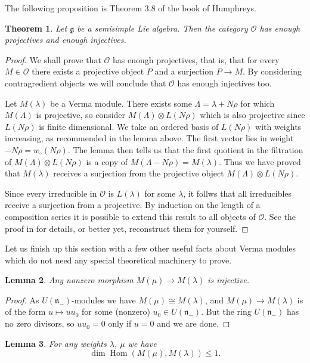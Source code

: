 \documentclass[12pt]{article}
\theoremstyle{plain}
\newtheorem{thm}{Theorem}[section]
\newtheorem{lemma}[thm]{Lemma}
\theoremstyle{definition}
\numberwithin{equation}{section}
\DeclareMathOperator{\Hom}{Hom}
\newcommand{\la}{\lambda}
\newcommand{\La}{\Lambda}
\newcommand{\g}{\mathfrak{g}}
\newcommand{\n}{\mathfrak{n}}
\newcommand{\OO}{\mathcal{O}}
\begin{document}
The following proposition is Theorem 3.8 of the book \cite{humbgg} of Humphreys.
\begin{thm}
Let $\g$ be a semisimple Lie algebra. Then the category $\OO$ has enough projectives and enough injectives.
\end{thm}


\begin{proof}
We shall prove that $\OO$ has enough projectives, that is, that for every $M \in \OO$ there exists a projective object $P$ and a surjection $P \rightarrow M$. By considering contragredient objects we will conclude that $\OO$ has enough injectives too.

Let $M(\la)$ be a Verma module. There exists some $\La = \la + N \rho$ for which $M(\La)$ is projective, so consider $M(\La) \otimes L(N\rho)$ which is also projective since $L(N\rho)$ is finite dimensional. We take an ordered basis of $L(N\rho)$ with weights increasing, as recommended in the lemma above. The first vector lies in weight $-N\rho = w_\circ(N\rho)$. The lemma then tells us that the first quotient in the filtration of $M(\La) \otimes L(N\rho)$ is a copy of $M(\La-N\rho) = M(\la)$. Thus we have proved that $M(\la)$ receives a surjection from the projective object $M(\La) \otimes L(N\rho)$.

Since every irreducible in $\OO$ is $L(\la)$ for some $\la$, it follws that all irreducibles receive a surjection from a projective. By induction on the length of a composition series it is possible to extend this result to all objects of $\OO$. See the proof in \cite{humbgg} for details, or better yet, reconstruct them for yourself.
\end{proof}


Let us finish up this section with a few other useful facts about Verma modules which do not need any special theoretical machinery to prove.
\begin{lemma}
Any nonzero morphism $M(\mu) \rightarrow M(\la)$ is injective.
\end{lemma}

\begin{proof}
As $U(\n_-)$-modules we have $M(\mu) \cong M(\la)$, and $M(\mu) \rightarrow M(\la)$ is of the form $u \mapsto u u_0$ for some (nonzero) $u_0 \in U(\n_-)$. But the ring $U(\n_-)$ has no zero divisors, so $u u_0 = 0$ only if $u = 0$ and we are done.
\end{proof}


\begin{lemma}
For any weights $\la$, $\mu$ we have
\[
\dim \Hom(M(\mu), M(\la)) \leq 1.
\]
\end{lemma}
\end{document}
